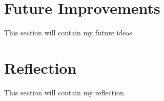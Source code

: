 \section{Future Improvements}
\label{s:Future-improvements}
This section will contain my future ideas

\section{Reflection}
\label{s:Reflection}
This section will contain my reflection

